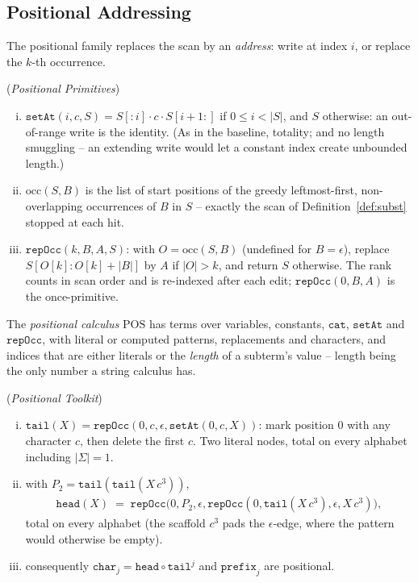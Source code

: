 \documentclass[runningheads,envcountsect]{llncs}
\begin{document}
\subsection{Positional Addressing}

The positional family replaces the scan by an \emph{address}: write at index $i$, or replace the $k$-th occurrence.

\begin{definition}
    (\emph{Positional Primitives})
    \label{def:pos}
    \begin{enumerate}[(i)]
        \item $\mathtt{setAt}(i, c, S) = S[{:}i]\cdot c\cdot S[i{+}1{:}]$ if $0 \leq i < |S|$, and $S$ otherwise: an out-of-range write is the identity. (As in the baseline, totality; and no length smuggling -- an extending write would let a constant index create unbounded length.)
        \item $\mathrm{occ}(S, B)$ is the list of start positions of the greedy leftmost-first, non-overlapping occurrences of $B$ in $S$ -- exactly the scan of Definition~\ref{def:subst} stopped at each hit.
        \item $\mathtt{repOcc}(k, B, A, S)$: with $O = \mathrm{occ}(S, B)$ (undefined for $B = \epsilon$), replace $S[O[k]{:}O[k]{+}|B|]$ by $A$ if $|O| > k$, and return $S$ otherwise. The rank counts in scan order and is re-indexed after each edit; $\mathtt{repOcc}(0, B, A)$ is the once-primitive.
    \end{enumerate}
    The \emph{positional calculus} $\mathrm{POS}$ has terms over variables, constants, $\mathtt{cat}$, $\mathtt{setAt}$ and $\mathtt{repOcc}$, with literal or computed patterns, replacements and characters, and indices that are either literals or the \emph{length} of a subterm's value -- length being the only number a string calculus has.
\end{definition}

\begin{proposition}
    (\emph{Positional Toolkit})
    \label{prop:pos-toolkit}
    \begin{enumerate}[(i)]
        \item $\mathtt{tail}(X) = \mathtt{repOcc}(0, c, \epsilon, \mathtt{setAt}(0, c, X))$: mark position $0$ with any character $c$, then delete the first $c$. Two literal nodes, total on every alphabet including $|\Sigma| = 1$.
        \item with $P_2 = \mathtt{tail}(\mathtt{tail}(X\,c^3))$,
        \begin{align*}
            \mathtt{head}(X) \;=\; \mathtt{repOcc}\big(0, P_2, \epsilon, \mathtt{repOcc}(0, \mathtt{tail}(X\,c^3), \epsilon, X\,c^3)\big),
        \end{align*}
        total on every alphabet (the scaffold $c^3$ pads the $\epsilon$-edge, where the pattern would otherwise be empty).
        \item consequently $\mathtt{char}_j = \mathtt{head} \circ \mathtt{tail}^j$ and $\mathtt{prefix}_j$ are positional.
    \end{enumerate}
\end{proposition}
\end{document}
